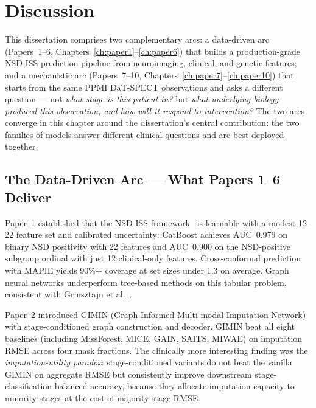 
\chapter{Discussion}
\label{ch:discussion}

This dissertation comprises two complementary arcs: a data-driven arc (Papers~1--6, Chapters~\ref{ch:paper1}--\ref{ch:paper6}) that builds a production-grade NSD-ISS prediction pipeline from neuroimaging, clinical, and genetic features; and a mechanistic arc (Papers~7--10, Chapters~\ref{ch:paper7}--\ref{ch:paper10}) that starts from the same PPMI DaT-SPECT observations and asks a different question --- not \emph{what stage is this patient in?} but \emph{what underlying biology produced this observation, and how will it respond to intervention?} The two arcs converge in this chapter around the dissertation's central contribution: the two families of models answer different clinical questions and are best deployed together.

\section{The Data-Driven Arc --- What Papers 1--6 Deliver}
\label{sec:disc-datadriven}

Paper~1 established that the NSD-ISS framework~\cite{simuni2024} is learnable with a modest 12--22 feature set and calibrated uncertainty: CatBoost achieves AUC~0.979 on binary NSD positivity with 22 features and AUC~0.900 on the NSD-positive subgroup ordinal with just 12 clinical-only features. Cross-conformal prediction with MAPIE yields 90\%+ coverage at set sizes under 1.3 on average. Graph neural networks underperform tree-based methods on this tabular problem, consistent with Grinsztajn et al.~\cite{grinsztajn2022trees}.

Paper~2 introduced GIMIN (Graph-Informed Multi-modal Imputation Network) with stage-conditioned graph construction and decoder. GIMIN beat all eight baselines (including MissForest, MICE, GAIN, SAITS, MIWAE) on imputation RMSE across four mask fractions. The clinically more interesting finding was the \emph{imputation-utility paradox}: stage-conditioned variants do not beat the vanilla GIMIN on aggregate RMSE but consistently improve downstream stage-classification balanced accuracy, because they allocate imputation capacity to minority stages at the cost of majority-stage RMSE.

